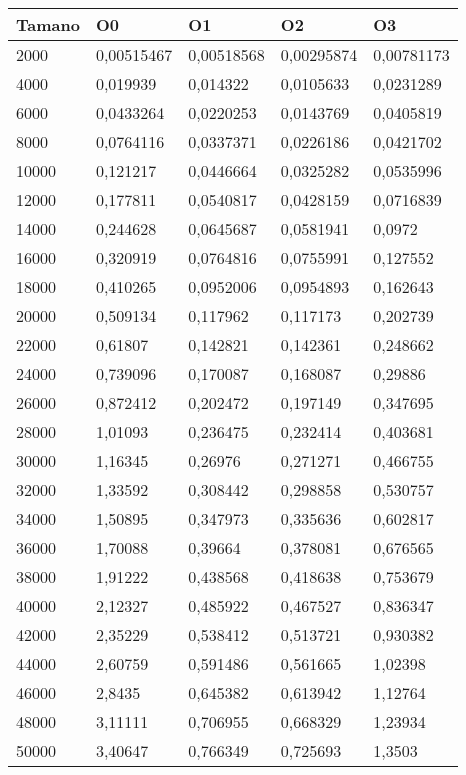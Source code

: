 \begin{tabular}{|l|l|l|l|l|}
	\hline
	Tamano & O0 & O1 & O2 & O3 \\
	\hline
	\hline
	2000 & 0,00515467 & 0,00518568 & 0,00295874 & 0,00781173 \\
	\hline
	4000 & 0,019939 & 0,014322 & 0,0105633 & 0,0231289 \\
	\hline
	6000 & 0,0433264 & 0,0220253 & 0,0143769 & 0,0405819 \\
	\hline
	8000 & 0,0764116 & 0,0337371 & 0,0226186 & 0,0421702 \\
	\hline
	10000 & 0,121217 & 0,0446664 & 0,0325282 & 0,0535996 \\
	\hline
	12000 & 0,177811 & 0,0540817 & 0,0428159 & 0,0716839 \\
	\hline
	14000 & 0,244628 & 0,0645687 & 0,0581941 & 0,0972 \\
	\hline
	16000 & 0,320919 & 0,0764816 & 0,0755991 & 0,127552 \\
	\hline
	18000 & 0,410265 & 0,0952006 & 0,0954893 & 0,162643 \\
	\hline
	20000 & 0,509134 & 0,117962 & 0,117173 & 0,202739 \\
	\hline
	22000 & 0,61807 & 0,142821 & 0,142361 & 0,248662 \\
	\hline
	24000 & 0,739096 & 0,170087 & 0,168087 & 0,29886 \\
	\hline
	26000 & 0,872412 & 0,202472 & 0,197149 & 0,347695 \\
	\hline
	28000 & 1,01093 & 0,236475 & 0,232414 & 0,403681 \\
	\hline
	30000 & 1,16345 & 0,26976 & 0,271271 & 0,466755 \\
	\hline
	32000 & 1,33592 & 0,308442 & 0,298858 & 0,530757 \\
	\hline
	34000 & 1,50895 & 0,347973 & 0,335636 & 0,602817 \\
	\hline
	36000 & 1,70088 & 0,39664 & 0,378081 & 0,676565 \\
	\hline
	38000 & 1,91222 & 0,438568 & 0,418638 & 0,753679 \\
	\hline
	40000 & 2,12327 & 0,485922 & 0,467527 & 0,836347 \\
	\hline
	42000 & 2,35229 & 0,538412 & 0,513721 & 0,930382 \\
	\hline
	44000 & 2,60759 & 0,591486 & 0,561665 & 1,02398 \\
	\hline
	46000 & 2,8435 & 0,645382 & 0,613942 & 1,12764 \\
	\hline
	48000 & 3,11111 & 0,706955 & 0,668329 & 1,23934 \\
	\hline
	50000 & 3,40647 & 0,766349 & 0,725693 & 1,3503 \\
	\hline
\end{tabular}
